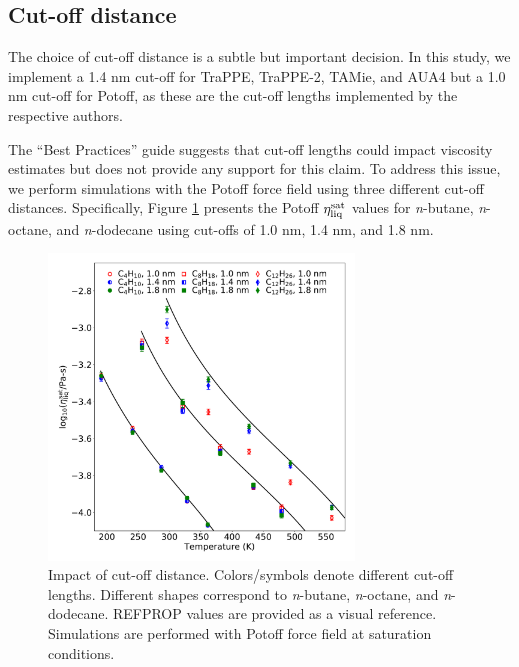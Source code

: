 \documentclass[preprint,review,12pt]{elsarticle}
\begin{document}
	
	\subsection{Cut-off distance}
	
	The choice of cut-off distance is a subtle but important decision. In this study, we implement a 1.4 nm cut-off for TraPPE, TraPPE-2, TAMie, and AUA4 but a 1.0 nm cut-off for Potoff, as these are the cut-off lengths implemented by the respective authors.
	
	
	The ``Best Practices'' guide suggests that cut-off lengths could impact viscosity estimates but does not provide any support for this claim. To address this issue, we perform simulations with the Potoff force field using three different cut-off distances. Specifically, Figure \ref{fig:cutoff_distance} presents the Potoff $\eta_{\rm liq}^{\rm sat}$ values for \textit{n}-butane, \textit{n}-octane, and \textit{n}-dodecane using cut-offs of 1.0 nm, 1.4 nm, and 1.8 nm. 
	
	
	\begin{figure}[htb!]
		\centering
		\includegraphics[width=3.2in]{cutoff_distance.pdf}
		\caption{Impact of cut-off distance. Colors/symbols denote different cut-off lengths. Different shapes correspond to \textit{n}-butane, \textit{n}-octane, and \textit{n}-dodecane. REFPROP values are provided as a visual reference. Simulations are performed with Potoff force field at saturation conditions.}
		\label{fig:cutoff_distance}
	\end{figure} 
\end{document}
